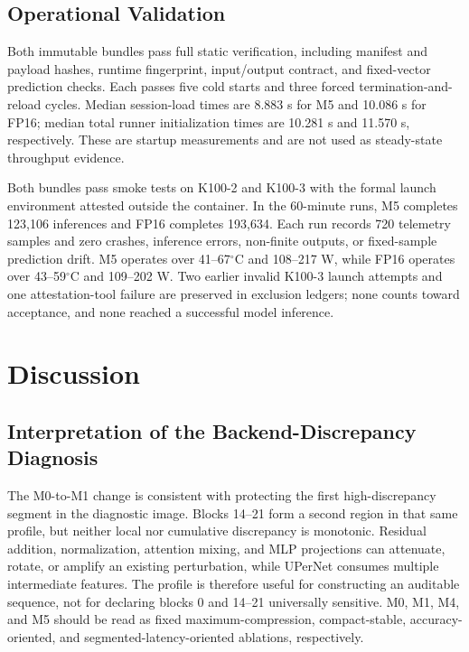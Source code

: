 \documentclass[conference]{IEEEtran}
\begin{document}
\balance
\subsection{Operational Validation}

Both immutable bundles pass full static verification, including manifest and payload hashes, runtime fingerprint, input/output contract, and fixed-vector prediction checks. Each passes five cold starts and three forced termination-and-reload cycles. Median session-load times are 8.883 s for M5 and 10.086 s for FP16; median total runner initialization times are 10.281 s and 11.570 s, respectively. These are startup measurements and are not used as steady-state throughput evidence.

Both bundles pass smoke tests on K100-2 and K100-3 with the formal launch environment attested outside the container. In the 60-minute runs, M5 completes 123,106 inferences and FP16 completes 193,634. Each run records 720 telemetry samples and zero crashes, inference errors, non-finite outputs, or fixed-sample prediction drift. M5 operates over 41--67$^{\circ}$C and 108--217 W, while FP16 operates over 43--59$^{\circ}$C and 109--202 W. Two earlier invalid K100-3 launch attempts and one attestation-tool failure are preserved in exclusion ledgers; none counts toward acceptance, and none reached a successful model inference.

\section{Discussion}
\label{sec:discussion}

\subsection{Interpretation of the Backend-Discrepancy Diagnosis}

The M0-to-M1 change is consistent with protecting the first high-discrepancy segment in the diagnostic image. Blocks 14--21 form a second region in that same profile, but neither local nor cumulative discrepancy is monotonic. Residual addition, normalization, attention mixing, and MLP projections can attenuate, rotate, or amplify an existing perturbation, while UPerNet consumes multiple intermediate features. The profile is therefore useful for constructing an auditable sequence, not for declaring blocks 0 and 14--21 universally sensitive. M0, M1, M4, and M5 should be read as fixed maximum-compression, compact-stable, accuracy-oriented, and segmented-latency-oriented ablations, respectively.
\end{document}
